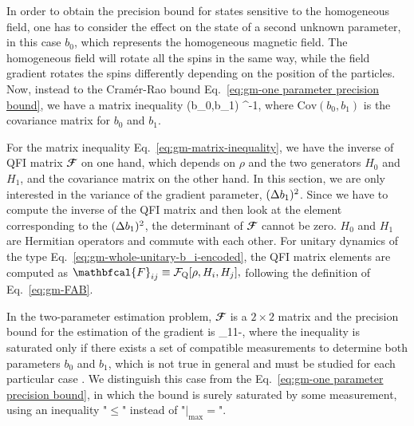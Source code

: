 In order to obtain the precision bound for states sensitive to the
homogeneous field, one has to consider the effect on the state of a second
unknown parameter, in this case $b_0$, which represents the homogeneous magnetic field.
The homogeneous field will rotate all the spins in the same way,
while the field gradient rotates the spins
differently depending on the position of the particles.
Now, instead to the Cram\'er-Rao bound Eq.~\eqref{eq:gm-one parameter precision bound},
we have a matrix inequality \cite{Paris2009}
\be
  (b_0,b_1) \geqslant {}^{-1},
  \label{eq:gm-matrix-inequality}
\ee
where $\text{Cov}(b_0,b_1)$ is the covariance matrix for $b_0$ and $b_1$.

For the matrix inequality Eq.~\eqref{eq:gm-matrix-inequality}, we have the inverse of QFI matrix $\mathbfcal{F}$ on one hand, which depends on $\rho$ and the two generators $H_0$ and $H_1$, and the covariance matrix on the other hand.
In this section, we are only interested in the variance of the gradient parameter, $(\Delta b_1 )^2$.
Since we have to compute the inverse of the QFI matrix and then look at the element corresponding to the $(\Delta b_1 )^2$, the determinant of $\mathbfcal{F}$ cannot be zero.
$H_0$ and $H_1$ are Hermitian operators and commute with each other.
For unitary dynamics of the type Eq.~\eqref{eq:gm-whole-unitary-b_i-encoded}, the QFI matrix elements are computed as $\mathbfcal{F}_{ij}\equiv \qfif{\rho, H_i, H_j},$ following the definition of Eq.~\eqref{eq:gm-FAB}.

In the two-parameter estimation problem, $\mathbfcal{F}$ is a $2 \times 2$ matrix and the precision bound for the estimation of the gradient is
\be
\label{eq:gm-bound-for-b1-with-qfi-els}
  \leqslant {}_{11}-,
\ee
where the inequality is saturated only if there exists a set of compatible measurements to determine both parameters $b_0$ and $b_1$, which is not true in general and must be studied for each particular case \cite{Paris2009, Ragy2016}.
We distinguish this case from the Eq.~\eqref{eq:gm-one parameter precision bound}, in which the bound is surely saturated by some measurement, using an inequality "$\leqslant$" instead of "$|_{\max}=$".

